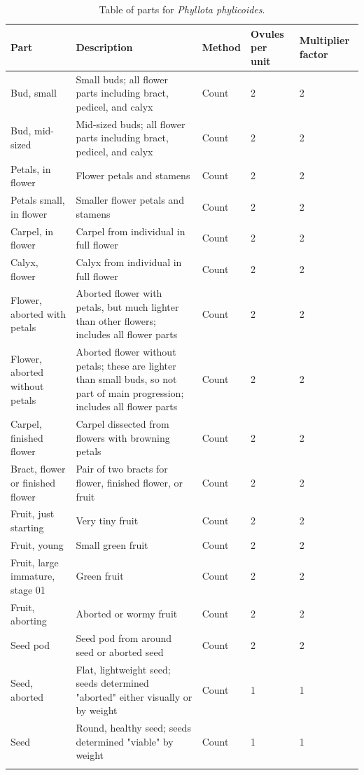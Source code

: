 \documentclass[10pt,twoside]{article}\usepackage[]{graphicx}\usepackage[]{color}
\begin{document}
\begingroup\small
\begin{longtable}{p{4.5cm}p{6cm}p{2cm}p{1cm}p{1cm}}
\caption{Table of parts for \emph{Phyllota phylicoides}.} \\ 
  \hline
Part & Description & Method & Ovules per unit & Multiplier factor \\ 
  \hline
Bud, small & Small buds; all flower parts including bract, pedicel, and calyx & Count & 2 &   2 \\ 
  Bud, mid-sized & Mid-sized buds; all flower parts including bract, pedicel, and calyx & Count & 2 &   2 \\ 
  Petals, in flower & Flower petals and stamens & Count & 2 &   2 \\ 
  Petals small, in flower & Smaller flower petals and stamens & Count & 2 &   2 \\ 
  Carpel, in flower & Carpel from individual in full flower & Count & 2 &   2 \\ 
  Calyx, flower & Calyx from individual in full flower & Count & 2 &   2 \\ 
  Flower, aborted with petals & Aborted flower with petals, but much lighter than other flowers; includes all flower parts & Count & 2 &   2 \\ 
  Flower, aborted without petals & Aborted flower without petals; these are lighter than small buds, so not part of main progression;  includes all flower parts & Count & 2 &   2 \\ 
  Carpel, finished flower & Carpel dissected from flowers with browning petals & Count & 2 &   2 \\ 
  Bract, flower or finished flower & Pair of two bracts for flower, finished flower, or fruit & Count & 2 &   2 \\ 
  Fruit, just starting & Very tiny fruit & Count & 2 &   2 \\ 
  Fruit, young & Small green fruit & Count & 2 &   2 \\ 
  Fruit, large immature, stage 01 & Green fruit & Count & 2 &   2 \\ 
  Fruit, aborting & Aborted or wormy fruit & Count & 2 &   2 \\ 
  Seed pod & Seed pod from around seed or aborted seed & Count & 2 &   2 \\ 
  Seed, aborted & Flat, lightweight seed; seeds determined "aborted" either visually or by weight & Count & 1 &   1 \\ 
  Seed & Round, healthy seed; seeds determined "viable" by weight & Count & 1 &   1 \\ 
   \hline
\hline
\label{tab:parts_Phyllota_phylicoides}
\end{longtable}
\endgroup
\end{document}
